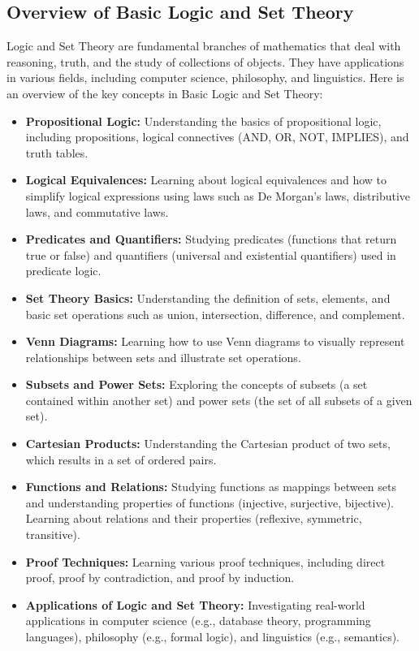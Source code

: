 \documentclass[openany]{book}
\begin{document}
\subsection{Overview of Basic Logic and Set Theory}
Logic and Set Theory are fundamental branches of mathematics that deal with reasoning, truth, and the study of collections of objects. They have applications in various fields, including computer science, philosophy, and linguistics. Here is an overview of the key concepts in Basic Logic and Set Theory:
\begin{itemize}
    \item \textbf{Propositional Logic:} Understanding the basics of propositional logic, including propositions, logical connectives (AND, OR, NOT, IMPLIES), and truth tables.
    \item \textbf{Logical Equivalences:} Learning about logical equivalences and how to simplify logical expressions using laws such as De Morgan's laws, distributive laws, and commutative laws.
    \item \textbf{Predicates and Quantifiers:} Studying predicates (functions that return true or false) and quantifiers (universal and existential quantifiers) used in predicate logic.
    \item \textbf{Set Theory Basics:} Understanding the definition of sets, elements, and basic set operations such as union, intersection, difference, and complement.
    \item \textbf{Venn Diagrams:} Learning how to use Venn diagrams to visually represent relationships between sets and illustrate set operations.
    \item \textbf{Subsets and Power Sets:} Exploring the concepts of subsets (a set contained within another set) and power sets (the set of all subsets of a given set).
    \item \textbf{Cartesian Products:} Understanding the Cartesian product of two sets, which results in a set of ordered pairs.
    \item \textbf{Functions and Relations:} Studying functions as mappings between sets and understanding properties of functions (injective, surjective, bijective). Learning about relations and their properties (reflexive, symmetric, transitive).
    \item \textbf{Proof Techniques:} Learning various proof techniques, including direct proof, proof by contradiction, and proof by induction.
    \item \textbf{Applications of Logic and Set Theory:} Investigating real-world applications in computer science (e.g., database theory, programming languages), philosophy (e.g., formal logic), and linguistics (e.g., semantics).
\end{itemize}
\end{document}
